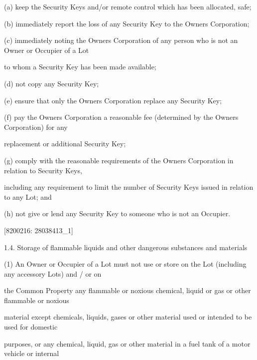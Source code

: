 \documentclass{article}
\begin{document}
{\fontsize{9.962}{1}(a) keep the Security Keys and/or remote control which has been allocated, safe; }

{\fontsize{9.962}{1}(b) immediately report the loss of any Security Key to the Owners Corporation; }

{\fontsize{9.962}{1}(c) immediately noting the Owners Corporation of any person who is not an Owner or Occupier of a Lot }

{\fontsize{10.02}{1}to whom a Security Key has been made available; }

{\fontsize{9.962}{1}(d) not copy any Security Key; }

{\fontsize{9.962}{1}(e) ensure that only the Owners Corporation replace any Security Key; }

{\fontsize{9.962}{1}(f) pay the Owners Corporation a reasonable fee (determined by the Owners Corporation) for any }

{\fontsize{10.02}{1}replacement or additional Security Key; }

{\fontsize{9.962}{1}(g) comply with the reasonable requirements of the Owners Corporation in relation to Security Keys, }

{\fontsize{10.02}{1}including any requirement to limit the number of Security Keys issued in relation to any Lot; and }

{\fontsize{9.962}{1}(h) not give or lend any Security Key to someone who is not an Occupier. }

\newpage
















{\fontsize{7.02}{1}[8200216: 28038413\_1] }


{\fontsize{9.99}{1}1.4. Storage of flammable liquids and other dangerous substances and materials }

{\fontsize{9.962}{1}(1) An Owner or Occupier of a Lot must not use or store on the Lot (including any accessory Lots) and / or on }

{\fontsize{10.02}{1}the Common Property any flammable or noxious chemical, liquid or gas or other flammable or noxious }

{\fontsize{10.02}{1}material except chemicals, liquids, gases or other material used or intended to be used for domestic }

{\fontsize{10.02}{1}purposes, or any chemical, liquid, gas or other material in a fuel tank of a motor vehicle or internal }
\end{document}
